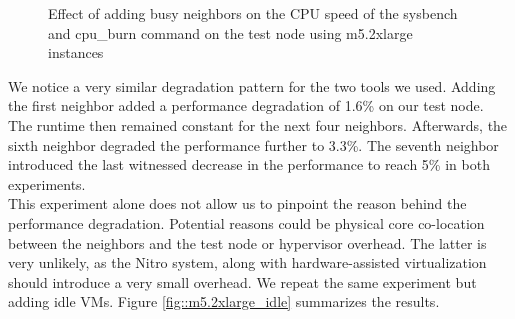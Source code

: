 \begin{figure}[H]
\centering
{}
\caption{Effect of adding busy neighbors on the CPU speed of the sysbench and cpu\_burn command on the 
test node using m5.2xlarge instances}
\label{fig::m5.2xlarge_busy}
\end{figure}
\noindent
We notice a very similar degradation pattern for the two tools we used.
Adding the first neighbor added a performance degradation of  1.6\% on our test node. The runtime then 
remained constant for the next four neighbors. Afterwards, the sixth neighbor degraded the performance
further to 3.3\%. The seventh neighbor introduced the last witnessed decrease in the performance to 
reach 5\% in both experiments. \\ 
This experiment alone does not allow us to pinpoint the reason behind the performance degradation.
Potential reasons could be physical core co-location between the neighbors and the test node or 
hypervisor overhead. The latter is very unlikely, as the Nitro system, along with hardware-assisted 
virtualization should introduce a very small overhead. 
We repeat the same experiment but adding idle VMs. 
Figure \ref{fig::m5.2xlarge_idle} summarizes the results. 

